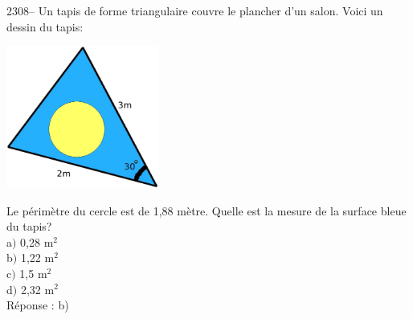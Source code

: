 \documentclass[letterpaper, 12pt]{article}
\begin{document}
2308-- Un tapis de forme triangulaire couvre le plancher d'un salon. Voici un dessin du tapis:
\begin{center}
 \includegraphics[width=5cm,bb=14 14 528 494]{Q2308.eps}
\end{center}
Le p\'erim\`etre du cercle est de 1,88 m\`etre. Quelle est la mesure de la surface bleue du tapis? \\

a$)$ 0,28 m$^{2}$\\
b$)$ 1,22 m$^{2}$\\
c$)$ 1,5 m$^{2}$\\
d$)$ 2,32 m$^{2}$\\

R\'eponse : b)\\
\end{document}
